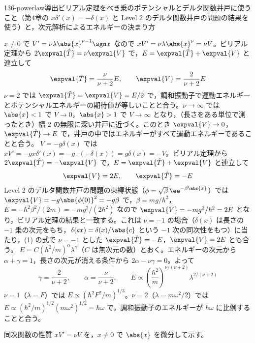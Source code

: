 \documentclass[uplatex,dvipdfmx,a4paper,11pt]{jsarticle}
\begin{document}
\begin{mondai}{136-powerlaw}{導出}{ビリアル定理をべき乗のポテンシャルとデルタ関数井戸に使うこと（第4章の $x\delta'(x)=-\delta(x)$ と Level 2 のデルタ関数井戸の問題の結果を使う）と，次元解析によるエネルギーの決まり方}
\begin{tadashii}
\keisan
{} $x\neq0$ で $V'=\nu\lambda\abs{x}^{\nu-1}\sgn x$ なので $xV'=\nu\lambda\abs{x}^{\nu}=\nu V$。ビリアル定理から $2\expval{\hat{T}}=\nu\expval{V}$ で，$E=\expval{\hat{T}}+\expval{V}$ と連立して
\[ \expval{\hat{T}}=\frac{\nu}{\nu+2}E,\qquad \expval{V}=\frac{2}{\nu+2}E \]
$\nu=2$ では $\expval{\hat{T}}=\expval{V}=E/2$ で，調和振動子で運動エネルギーとポテンシャルエネルギーの期待値が等しいことと合う。$\nu\to\infty$ では $\abs{x}<1$ で $V\to0$，$\abs{x}>1$ で $V\to\infty$ となり，（長さをある単位で測ったとき）幅 $2$ の無限に深い井戸に近づく。このとき $\expval{V}\to0$，$\expval{\hat{T}}\to E$ で，井戸の中ではエネルギーがすべて運動エネルギーであることと合う。
 $V=-g\delta(x)$ では $xV'=-gx\delta'(x)=-g\cdot(-\delta(x))=g\delta(x)=-V$。ビリアル定理から $2\expval{\hat{T}}=-\expval{V}$ で，$E=\expval{\hat{T}}+\expval{V}$ と連立して
\[ \expval{V}=2E,\qquad \expval{\hat{T}}=-E \]
Level 2 のデルタ関数井戸の問題の束縛状態（$\phi=\sqrt{\beta}\,\ee^{-\beta\abs{x}}$）では $\expval{V}=-g\abs{\phi(0)}^{2}=-g\beta$ で，$\beta=mg/\hbar^{2}$，$E=-\hbar^{2}\beta^{2}/(2m)=-mg^{2}/(2\hbar^{2})$ なので $\expval{V}=-mg^{2}/\hbar^{2}=2E$ となり，ビリアル定理の結果と一致する。これは $\nu=-1$ の場合（$\delta(x)$ は長さの $-1$ 乗の次元をもち，$\delta(cx)=\delta(x)/\abs{c}$ という $-1$ 次の同次性をもつ）に当たり，(1) の式で $\nu=-1$ とした $\expval{\hat{T}}=-E$，$\expval{V}=2E$ とも合う。
 $E=C(\hbar^{2}/m)^{\alpha}\lambda^{\gamma}$（$C$ は無次元の数）とおく。エネルギーの次元から $\alpha+\gamma=1$，長さの次元が消える条件から $2\alpha-\nu\gamma=0$。よって
\[ \gamma=\frac{2}{\nu+2},\qquad \alpha=\frac{\nu}{\nu+2},\qquad E\propto\left(\frac{\hbar^{2}}{m}\right)^{\nu/(\nu+2)}\lambda^{2/(\nu+2)} \]
$\nu=1$（$\lambda=F$）では $E\propto(\hbar^{2}F^{2}/m)^{1/3}$。$\nu=2$（$\lambda=m\omega^{2}/2$）では $E\propto(\hbar^{2}/m)^{1/2}(m\omega^{2})^{1/2}=\hbar\omega$ で，調和振動子のエネルギーが $\hbar\omega$ に比例することと合う。
\begin{ronten}
  \item {} 同次関数の性質 $xV'=\nu V$ を，$x\neq0$ で $\abs{x}$ を微分して示す。

\end{ronten}
\end{tadashii}
\end{mondai}
\end{document}
